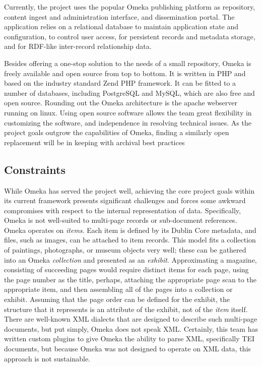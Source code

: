 Currently, the project uses the popular Omeka publishing platform as repository, content ingest and administration interface, and dissemination portal. The application relies on a relational database to maintain application state and configuration, to control user access, for persistent records and metadata storage, and for RDF-like inter-record relationship data. 

Besides offering a one-stop solution to the needs of a small repository, Omeka is freely available and open source from top to bottom. It is written in PHP and based on the industry standard Zend PHP framework. It can be fitted to a number of databases, including PostgreSQL and MySQL, which are also free and open source. Rounding out the Omeka architecture is the apache webserver running on linux. Using open source software allows the team great flexibility in customizing the software, and independence in resolving technical issues. As the project goals outgrow the capabilities of Omeka, finding a similarly open replacement will be in keeping with archival best practices \needcite

\subsection{Constraints}
While Omeka has served the project well, achieving the core project goals within its current framework presents significant challenges and forces some awkward compromises  with respect to the internal representation of data. Specifically, Omeka is not well-suited to multi-page records or sub-document references. Omeka operates on \emph{items}. Each item is defined by its Dublin Core metadata, and files, such as images, can be attached to item records. This model fits a collection of paintings, photographs, or museum objects very well; these can be gathered into an Omeka \emph{collection} and presented as an \emph{exhibit}. Approximating a magazine, consisting of succeeding pages would require distinct items for each page, using the page number as the title, perhaps, attaching the appropriate page scan to the appropriate item, and then assembling all of the pages into a collection or exhibit. Assuming that the page order can be defined for the exhibit, the structure that it represents is an attribute of the exhibit, not of the \emph{item} itself. 
There are well-known XML dialects that are designed to describe such multi-page documents, but put simply, Omeka does not speak XML. Certainly, this team has written custom plugins to give Omeka the ability to parse XML, specifically TEI documents, but because Omeka was not designed to operate on XML data, this approach is not sustainable.